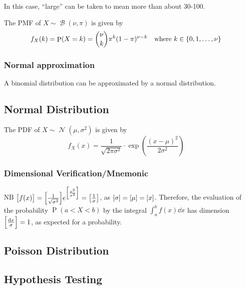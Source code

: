 \documentclass[fleqn,a4paper,11pt]{article}
\DeclareMathOperator{\Normal}{\mathcal{N}}
\DeclareMathOperator{\Binomial}{\mathcal{B}}
\DeclareMathOperator{\Prob}{\mathrm P}
\begin{document}
    In this case, ``large'' can be taken to mean more than about 30-100.

    The PMF of \(X \sim \Binomial(\nu, \pi)\) is given by
    \begin{equation*}
    f_X(k) = \Prob(X = k) = \binom \nu k \pi^k (1 - \pi)^{\nu - k}
        \quad \text{where \(k \in \set{0, 1, \dotsc, \nu}\)}
    \end{equation*}

    \subsubsection{Normal approximation}

    A binomial distribution can be approximated by a normal distribution.

    \subsection{Normal Distribution}


    The PDF of \(X \sim \Normal(\mu, \sigma^2)\) is given by
    \begin{equation*}
    f_X(x) = \frac{1}{\sqrt{2\pi\sigma^2}} \cdot
        \exp(\frac{(x - \mu)^2}{2\sigma^2})
    \end{equation*}

    \subsubsection{Dimensional Verification/Mnemonic}

    NB \(\bqty{f(x)} =
        \bqty{\frac 1{\sqrt{\sigma^2}}}
        e^{\bqty{\frac{x^2}{\sigma^2}}}
      = \bqty{\frac 1\sigma}\), as
    \(\bqty{\sigma} = \bqty{\mu} = \bqty{x}\). Therefore, the
    evaluation of the probability \(\Prob(a < X < b)\) by the integral
    \(\int_a^bf(x) \dd{x}\) has dimension
    \(\bqty{\frac{\dd{x}}{\sigma}} = 1\), as expected for a probability.

    \subsection{Poisson Distribution}


    \subsection{Hypothesis Testing}
\end{document}
